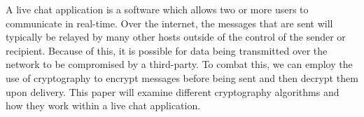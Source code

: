 A live chat application is a software which allows two or more users to communicate in real-time. 
Over the internet, the messages that are sent will typically be relayed by many other hosts
outside of the control of the sender or recipient. Because of this, it is possible for data
being transmitted over the network to be compromised by a third-party. To combat this, we can employ
the use of cryptography to encrypt messages before being sent and then decrypt them upon delivery. 
This paper will examine different cryptography algorithms and how they work within a live chat 
application.  
